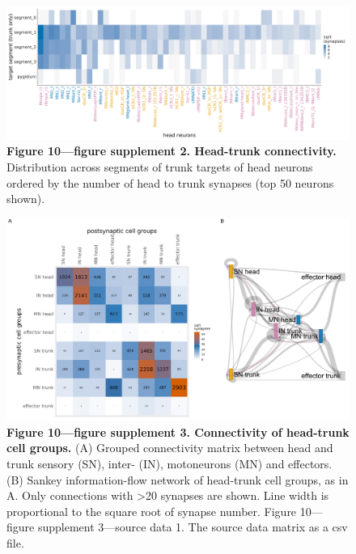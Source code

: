 \documentclass[
  11pt,
]{article}
\begin{document}
\begin{figure}[H]

{\centering \includegraphics[width=1\textwidth,height=\textheight]{Figures/Figure10_fig_suppl2.png}

}

\caption{\textbf{Figure 10---figure supplement 2. Head-trunk
connectivity.} Distribution across segments of trunk targets of head
neurons ordered by the number of head to trunk synapses (top 50 neurons
shown).}

\end{figure}%

\begin{figure}[H]

{\centering \includegraphics[width=1\textwidth,height=\textheight]{Figures/Figure10_fig_suppl3.png}

}

\caption{\textbf{Figure 10---figure supplement 3. Connectivity of
head-trunk cell groups.} (A) Grouped connectivity matrix between head
and trunk sensory (SN), inter- (IN), motoneurons (MN) and effectors. (B)
Sankey information-flow network of head-trunk cell groups, as in A. Only
connections with \textgreater20 synapses are shown. Line width is
proportional to the square root of synapse number. Figure 10---figure
supplement 3---source data 1. The source data matrix as a csv file.}

\end{figure}%
\end{document}

